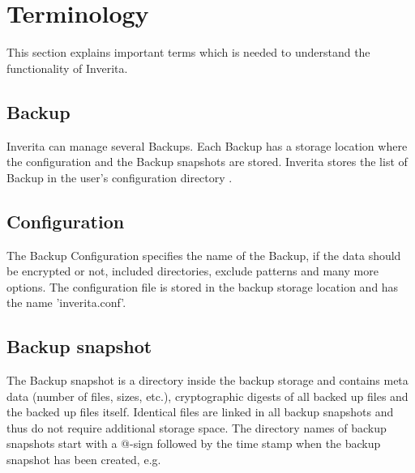 \section{Terminology}

This section explains important terms which is needed to understand
the functionality of Inverita.

\subsection{Backup}
   Inverita can manage several Backups. Each Backup has
         a storage location where the configuration and the
         Backup snapshots are stored.
         Inverita stores the list of Backup in the user's
         configuration directory .

\label{test1}

\subsection{Configuration}
         The Backup Configuration specifies the name of the Backup,
         if the data should be encrypted or not, included
         directories, exclude patterns and many more options.
         The configuration file is stored in the backup storage
         location and has the name 'inverita.conf'.

\label{test2}

\subsection{Backup snapshot}
         The Backup snapshot is a directory inside the
         backup storage and contains meta data (number of files, sizes, etc.),
         cryptographic digests of all backed up files and the backed up files itself.
         Identical files are linked in all backup snapshots and thus do not
         require additional storage space.
         The directory names of backup snapshots start with a @-sign followed by
         the time stamp when the backup snapshot has been created, e.g. 

